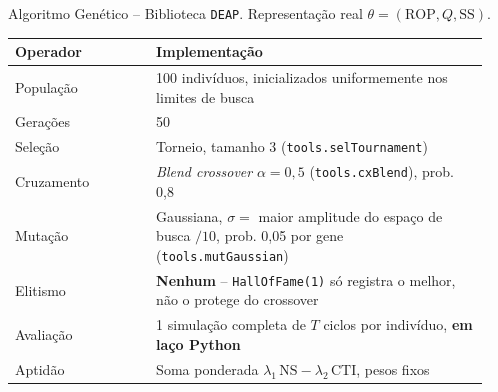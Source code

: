 \begin{frame}{Algoritmo Genético -- \antes}
  \footnotesize Biblioteca \texttt{DEAP}. Representação real $\theta=(\mathrm{ROP}, Q, \mathrm{SS})$.

  \renewcommand{\arraystretch}{1.05}\footnotesize
  \begin{tabular}{@{}p{0.28\linewidth}p{0.66\linewidth}@{}}
    \toprule
    \textbf{Operador} & \textbf{Implementação} \\
    \midrule
    População & 100 indivíduos, inicializados uniformemente nos limites de busca \\
    Gerações & 50 \\
    Seleção & Torneio, tamanho 3 (\texttt{tools.selTournament}) \\
    Cruzamento & \textit{Blend crossover} $\alpha=0{,}5$ (\texttt{tools.cxBlend}), prob. 0,8 \\
    Mutação & Gaussiana, $\sigma=$ maior amplitude do espaço de busca $/10$, prob. 0,05 por gene (\texttt{tools.mutGaussian}) \\
    Elitismo & \textbf{Nenhum} -- \texttt{HallOfFame(1)} só registra o melhor, não o protege do crossover \\
    Avaliação & 1 simulação completa de $T$ ciclos por indivíduo, \textbf{em laço Python} \\
    Aptidão & Soma ponderada $\lambda_1\,\mathrm{NS}-\lambda_2\,\mathrm{CTI}$, pesos fixos \\
    \bottomrule
  \end{tabular}

\end{frame}
